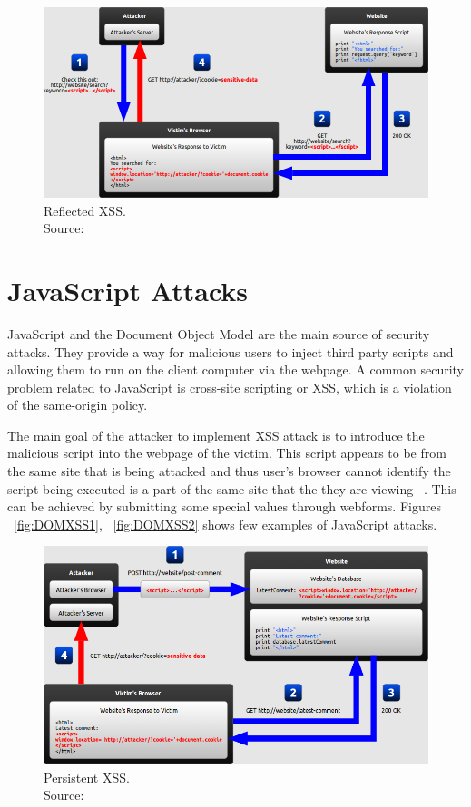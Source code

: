 \begin{figure}
\centering
\includegraphics[width=1\textwidth]{images/reflected-xss.png}
\caption[Reflected XSS]{Reflected XSS. \\Source: ~\cite{attacks} } 
\label{fig:reflectedXSS}
\end{figure} 

\section{JavaScript Attacks}
JavaScript and the Document Object Model are the main source of security attacks. They provide a way for malicious users to inject third party scripts and allowing them to run on the client computer via the webpage. A common security problem related to JavaScript is cross-site scripting or XSS, which is a violation of the same-origin policy. 

The main goal of the attacker to implement XSS attack is to introduce the malicious script into the webpage of the victim. This script appears to be from the same site that is being attacked and thus user's browser cannot identify the script being executed is a part of the same site that the they are viewing ~\cite{XSS}. This can be achieved by submitting some special values through webforms. Figures ~\ref{fig:DOMXSS1}, ~\ref{fig:DOMXSS2} shows few examples of JavaScript attacks.

\begin{figure}
\centering
\includegraphics[width=1\textwidth]{images/persistent-xss.png}
\caption[Persistent XSS]{Persistent XSS. \\Source: ~\cite{attacks} } 
\label{fig:PersistentXSS}
\end{figure}

